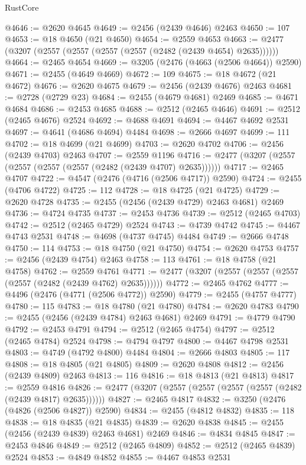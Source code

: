 \begin{lexlean}{RustCore}
\begin{coremodule}
@4646 := @2620 @4645
@4649 := @2456 (@2439 @4646) @2463
@4650 := 107
@4653 := @18 @4650 (@21 @4650)
@4654 := @2559 @4653
@4663 := @2477 (@3207 (@2557 (@2557 (@2557 (@2557 (@2482 (@2439 @4654) @2635))))))
@4664 := @2465 @4654
@4669 := @3205 (@2476 (@4663 (@2506 @4664)) @2590)
@4671 := @2455 (@4649 @4669)
@4672 := 109
@4675 := @18 @4672 (@21 @4672)
@4676 := @2620 @4675
@4679 := @2456 (@2439 @4676) @2463
@4681 := @2728 (@2729 @23)
@4684 := @2455 (@4679 @4681) @2469
@4685 := @4671 @4684
@4686 := @2453 @4685
@4688 := @2512 (@2465 @4646)
@4691 := @2512 (@2465 @4676) @2524
@4692 := @4688 @4691
@4694 := @4467 @4692 @2531
@4697 := @4641 (@4686 @4694) @4484
@4698 := @2666 @4697
@4699 := 111
@4702 := @18 @4699 (@21 @4699)
@4703 := @2620 @4702
@4706 := @2456 (@2439 @4703) @2463
@4707 := @2559 @1196
@4716 := @2477 (@3207 (@2557 (@2557 (@2557 (@2557 (@2482 (@2439 @4707) @2635))))))
@4717 := @2465 @4707
@4722 := @4547 (@2476 (@4716 (@2506 @4717)) @2590)
@4724 := @2455 (@4706 @4722)
@4725 := 112
@4728 := @18 @4725 (@21 @4725)
@4729 := @2620 @4728
@4735 := @2455 (@2456 (@2439 @4729) @2463 @4681) @2469
@4736 := @4724 @4735
@4737 := @2453 @4736
@4739 := @2512 (@2465 @4703)
@4742 := @2512 (@2465 @4729) @2524
@4743 := @4739 @4742
@4745 := @4467 @4743 @2531
@4748 := @4698 (@4737 @4745) @4484
@4749 := @2666 @4748
@4750 := 114
@4753 := @18 @4750 (@21 @4750)
@4754 := @2620 @4753
@4757 := @2456 (@2439 @4754) @2463
@4758 := 113
@4761 := @18 @4758 (@21 @4758)
@4762 := @2559 @4761
@4771 := @2477 (@3207 (@2557 (@2557 (@2557 (@2557 (@2482 (@2439 @4762) @2635))))))
@4772 := @2465 @4762
@4777 := @4496 (@2476 (@4771 (@2506 @4772)) @2590)
@4779 := @2455 (@4757 @4777)
@4780 := 115
@4783 := @18 @4780 (@21 @4780)
@4784 := @2620 @4783
@4790 := @2455 (@2456 (@2439 @4784) @2463 @4681) @2469
@4791 := @4779 @4790
@4792 := @2453 @4791
@4794 := @2512 (@2465 @4754)
@4797 := @2512 (@2465 @4784) @2524
@4798 := @4794 @4797
@4800 := @4467 @4798 @2531
@4803 := @4749 (@4792 @4800) @4484
@4804 := @2666 @4803
@4805 := 117
@4808 := @18 @4805 (@21 @4805)
@4809 := @2620 @4808
@4812 := @2456 (@2439 @4809) @2463
@4813 := 116
@4816 := @18 @4813 (@21 @4813)
@4817 := @2559 @4816
@4826 := @2477 (@3207 (@2557 (@2557 (@2557 (@2557 (@2482 (@2439 @4817) @2635))))))
@4827 := @2465 @4817
@4832 := @3250 (@2476 (@4826 (@2506 @4827)) @2590)
@4834 := @2455 (@4812 @4832)
@4835 := 118
@4838 := @18 @4835 (@21 @4835)
@4839 := @2620 @4838
@4845 := @2455 (@2456 (@2439 @4839) @2463 @4681) @2469
@4846 := @4834 @4845
@4847 := @2453 @4846
@4849 := @2512 (@2465 @4809)
@4852 := @2512 (@2465 @4839) @2524
@4853 := @4849 @4852
@4855 := @4467 @4853 @2531

\end{coremodule}
\end{lexlean}
